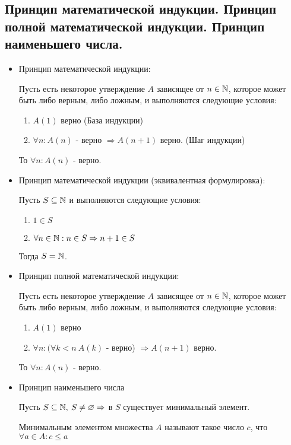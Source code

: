 \subsection{Принцип математической индукции. Принцип полной математической индукции. Принцип наименьшего числа.}{
	\begin{itemize}
		\item Принцип математической индукции:
		
		Пусть есть некоторое утверждение $A$ зависящее от $n \in \mathbb{N}$, которое может быть либо верным, либо ложным, и выполняются следующие условия:
		\begin{enumerate}
			\item $A(1)$ верно (База индукции)
			\item $\forall n : A(n)$ - верно $\Rightarrow A(n + 1)$ верно. (Шаг индукции)
		\end{enumerate}
		То $\forall n : A(n)$ - верно.
		
		\item Принцип математической индукции (эквивалентная формулировка):
		
		Пусть $S \subseteq \mathbb{N}$ и выполняются следующие условия:
		\begin{enumerate}
			\item $1 \in S$
			\item $\forall n \in \mathbb{N} : n \in S \Rightarrow n + 1 \in S$
		\end{enumerate}
		Тогда $S = \mathbb{N}$.
		
		\item Принцип полной математической индукции: 
		
		Пусть есть некоторое утверждение $A$ зависящее от $n \in \mathbb{N}$, которое может быть либо верным, либо ложным, и выполняются следующие условия:
		\begin{enumerate}
			\item $A(1)$ верно
			\item $\forall n : (\forall k < n \: A(k)$ - верно) $\Rightarrow A(n + 1)$ верно.
		\end{enumerate}
		То $\forall n : A(n)$ - верно.
		
		\item Принцип наименьшего числа
		
		Пусть $S \subseteq \mathbb{N}, \: S \neq \varnothing \Rightarrow$ в $S$ существует минимальный элемент.
		
		Минимальным элементом множества $A$ называют такое число $c$, что $\forall a \in A : c \leqslant a$
		
	\end{itemize}
}